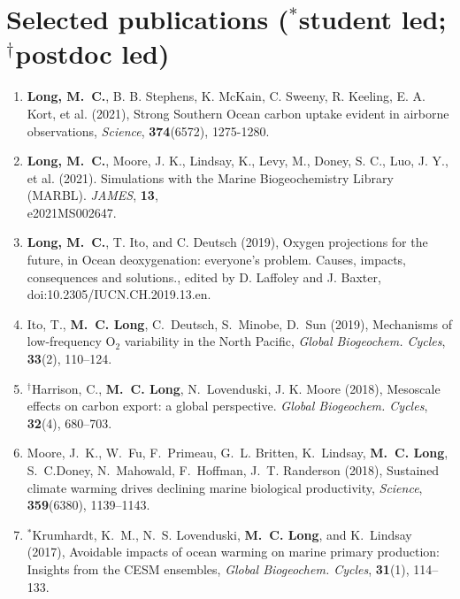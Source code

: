 \documentclass[12pt]{article}
\begin{document}
\section{Selected publications
{\footnotesize ($^*$student led; $^\dagger$postdoc led)}}

\begin{enumerate}[leftmargin=1.5em,font=\normalfont]
\setlength{\itemsep}{-0.2em}

\item
\textbf{{Long}, M.~C.}, B. B. Stephens, K. McKain, C. Sweeny, R. Keeling, E. A. Kort, et al.
(2021), Strong Southern Ocean carbon uptake evident in airborne observations, \textit{Science},
\textbf{374}(6572), {1275-1280}.

\item
\textbf{{Long}, M.~C.}, Moore, J. K., Lindsay, K., Levy, M., Doney, S. C., Luo, J. Y., et al. (2021). Simulations with the Marine Biogeochemistry Library (MARBL). \textit{JAMES}, \textbf{13}, \\e2021MS002647.

\item
\textbf{{Long}, M.~C.}, T. Ito, and C. Deutsch (2019), Oxygen projections for the future, in Ocean deoxygenation:
everyone’s problem. Causes, impacts, consequences and solutions., edited by D. Laffoley and J. Baxter, doi:10.2305/IUCN.CH.2019.13.en.

\item
Ito, T., \textbf{M.~C. Long}, C.~Deutsch, S.~Minobe, D.~Sun (2019), Mechanisms of low-frequency O$_2$ variability in the North Pacific, \textit{Global Biogeochem. Cycles}, \textbf{33}(2), 110--124.

\item
$^\dagger$Harrison, C., \textbf{M.~C. Long}, N.~{Lovenduski}, J. K. Moore (2018), {Mesoscale effects on carbon export: a global perspective}. \textit{Global Biogeochem. Cycles}, \textbf{32}(4), 680--703.

\item
Moore, J.~K., W.~Fu, F.~Primeau, G.~L. Britten, K.~Lindsay, \textbf{M.~C. Long},
S.~C.Doney, N.~Mahowald, F.~Hoffman, J.~T. Randerson
(2018), Sustained climate warming drives declining marine biological productivity, \textit{Science}, \textbf{359}(6380), 1139--1143.

\item
$^*${Krumhardt}, K.~M., N.~S. Lovenduski, \textbf{M.~C. Long}, and K.~Lindsay (2017),
  Avoidable impacts of ocean warming on marine primary production: Insights
  from the CESM ensembles, \textit{Global Biogeochem. Cycles},
  \textbf{31}(1), 114--133.


\end{enumerate}
\end{document}
